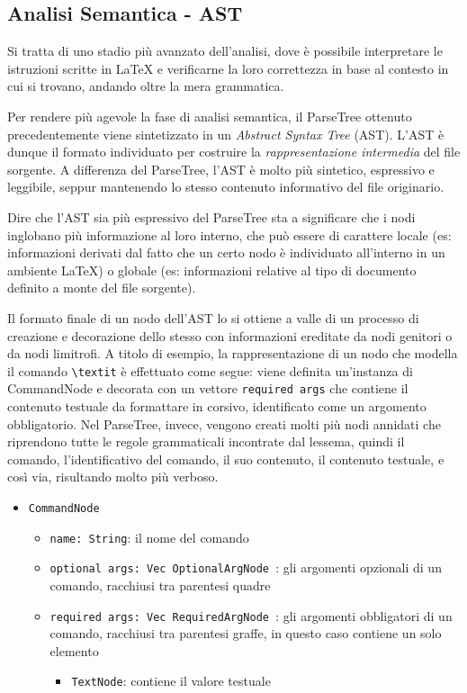 \documentclass{article}
\begin{document}
    \subsection{Analisi Semantica - AST}

    Si tratta di uno stadio più avanzato dell'analisi, dove è possibile interpretare le istruzioni scritte in LaTeX e verificarne la loro correttezza in base al contesto in cui si trovano, andando oltre la mera grammatica.

    Per rendere più agevole la fase di analisi semantica, il ParseTree ottenuto precedentemente viene sintetizzato in un \textit{Abstract Syntax Tree} (AST).
    L'AST è dunque il formato individuato per costruire la \textit{rappresentazione intermedia} del file sorgente.
    A differenza del ParseTree, l'AST è molto più sintetico, espressivo e leggibile, seppur mantenendo lo stesso contenuto informativo del file originario.

    Dire che l'AST sia più espressivo del ParseTree sta a significare che i nodi inglobano più informazione al loro interno, che può essere di carattere locale (es: informazioni derivati dal fatto che un certo nodo è individuato all'interno in un ambiente LaTeX) o globale (es: informazioni relative al tipo di documento definito a monte del file sorgente).

    Il formato finale di un nodo dell'AST lo si ottiene a valle di un processo di creazione e decorazione dello stesso con informazioni ereditate da nodi genitori o da nodi limitrofi. A titolo di esempio, la rappresentazione di un nodo che modella il comando \texttt{\textbackslash textit} è effettuato come segue: viene definita un'instanza di CommandNode e decorata con un vettore \texttt{required args} che contiene il contenuto testuale da formattare in corsivo, identificato come un argomento obbligatorio. Nel ParseTree, invece, vengono creati molti più nodi annidati che riprendono tutte le regole grammaticali incontrate dal lessema, quindi il comando, l'identificativo del comando, il suo contenuto, il contenuto testuale, e così via, risultando molto più verboso.

    \begin{itemize}
        \item \texttt{CommandNode}
        \begin{itemize}
            \item \texttt{name: String}: il nome del comando
            \item \texttt{optional args: Vec OptionalArgNode }: gli argomenti opzionali di un comando, racchiusi tra parentesi quadre
            \item \texttt{required args: Vec RequiredArgNode }: gli argomenti obbligatori di un comando, racchiusi tra parentesi graffe, in questo caso contiene un solo elemento
            \begin{itemize}
                \item \texttt{TextNode}: contiene il valore testuale
            \end{itemize}
        \end{itemize}
    \end{itemize}
\end{document}
